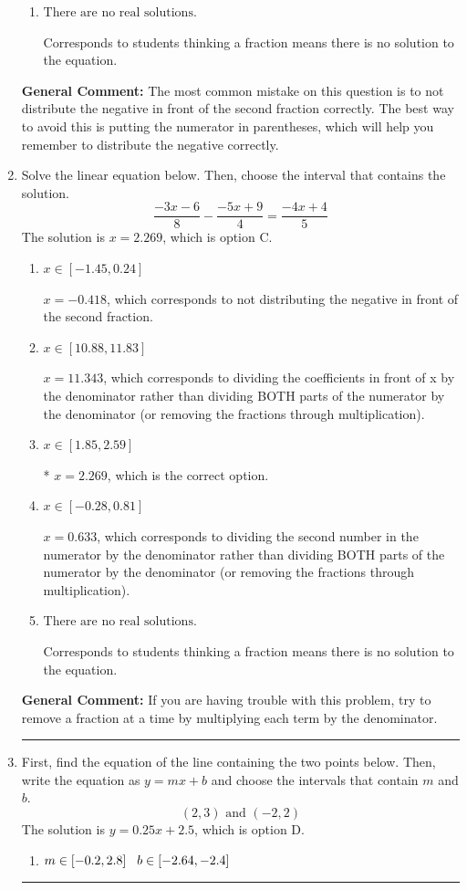 \documentclass{extbook}[14pt]
\newcommand{\litem}[1]{\item #1

\rule{\textwidth}{0.4pt}}
\begin{document}
\begin{enumerate}
{\begin{enumerate}[label=\Alph*.]
$x = -0.433$, which corresponds to not distributing the negative in front of the second parentheses correctly.
\item \( \text{There are no real solutions.} \)

Corresponds to students thinking a fraction means there is no solution to the equation.
\end{enumerate}

\textbf{General Comment:} The most common mistake on this question is to not distribute the negative in front of the second fraction correctly. The best way to avoid this is putting the numerator in parentheses, which will help you remember to distribute the negative correctly.
}
\litem{
Solve the linear equation below. Then, choose the interval that contains the solution.
\[ \frac{-3x -6}{8} - \frac{-5x + 9}{4} = \frac{-4x + 4}{5} \]The solution is \( x = 2.269 \), which is option C.\begin{enumerate}[label=\Alph*.]
\item \( x \in [-1.45, 0.24] \)

 $x = -0.418$, which corresponds to not distributing the negative in front of the second fraction.
\item \( x \in [10.88, 11.83] \)

 $x = 11.343$, which corresponds to dividing the coefficients in front of x by the denominator rather than dividing BOTH parts of the numerator by the denominator (or removing the fractions through multiplication).
\item \( x \in [1.85, 2.59] \)

* $x = 2.269$, which is the correct option.
\item \( x \in [-0.28, 0.81] \)

 $x = 0.633$, which corresponds to dividing the second number in the numerator by the denominator rather than dividing BOTH parts of the numerator by the denominator (or removing the fractions through multiplication).
\item \( \text{There are no real solutions.} \)

Corresponds to students thinking a fraction means there is no solution to the equation.
\end{enumerate}

\textbf{General Comment:} If you are having trouble with this problem, try to remove a fraction at a time by multiplying each term by the denominator.
}
\litem{
First, find the equation of the line containing the two points below. Then, write the equation as $ y=mx+b $ and choose the intervals that contain $m$ and $b$.
\[ (2, 3) \text{ and } (-2, 2) \]The solution is \( y = 0.25x + 2.5 \), which is option D.\begin{enumerate}[label=\Alph*.]
\item \( m \in [-0.2, 2.8] \hspace*{3mm} b \in [-2.64, -2.4] \)


\end{enumerate}}
\end{enumerate}
\end{document}
